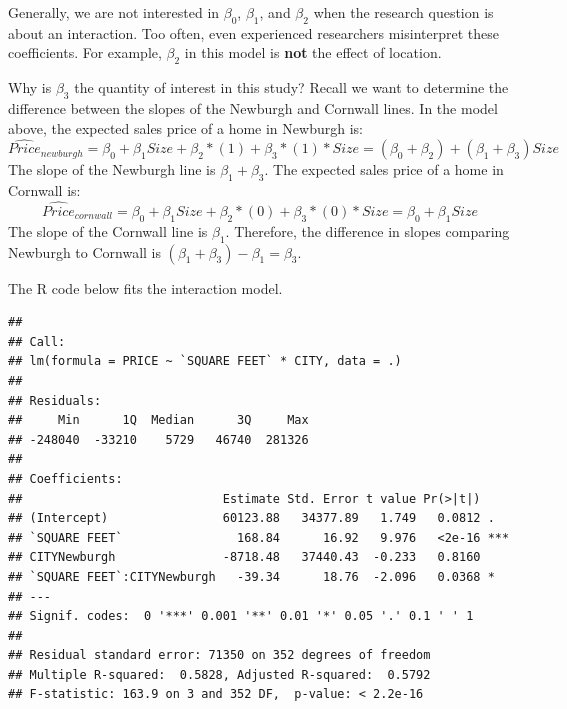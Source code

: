 \documentclass[]{book}
\newenvironment{Shaded}{\begin{snugshade}}{\end{snugshade}}
\newcommand{\DataTypeTok}[1]{\textcolor[rgb]{0.13,0.29,0.53}{#1}}
\newcommand{\KeywordTok}[1]{\textcolor[rgb]{0.13,0.29,0.53}{\textbf{#1}}}
\newcommand{\NormalTok}[1]{#1}
\newcommand{\OperatorTok}[1]{\textcolor[rgb]{0.81,0.36,0.00}{\textbf{#1}}}
\newcommand{\StringTok}[1]{\textcolor[rgb]{0.31,0.60,0.02}{#1}}
\begin{document}
Generally, we are not interested in \(\beta_0\), \(\beta_1\), and \(\beta_2\) when the research question is about an interaction. Too often, even experienced researchers misinterpret these coefficients. For example, \(\beta_2\) in this model is \textbf{not} the effect of location.

Why is \(\beta_3\) the quantity of interest in this study? Recall we want to determine the difference between the slopes of the Newburgh and Cornwall lines. In the model above, the expected sales price of a home in Newburgh is: \[\widehat{Price}_{newburgh} = \beta_0 + \beta_1 Size + \beta_2 * (1) + \beta_3 * (1) * Size = (\beta_0 + \beta_2) + (\beta_1 + \beta_3) Size\] The slope of the Newburgh line is \(\beta_1 + \beta_3\). The expected sales price of a home in Cornwall is: \[\widehat{Price}_{cornwall} = \beta_0 + \beta_1 Size + \beta_2 * (0) + \beta_3 * (0) * Size = \beta_0 + \beta_1 Size\] The slope of the Cornwall line is \(\beta_1\). Therefore, the difference in slopes comparing Newburgh to Cornwall is \((\beta_1 + \beta_3) - \beta_1 = \beta_3\).

The R code below fits the interaction model.

\begin{Shaded}
\end{Shaded}

\begin{verbatim}
## 
## Call:
## lm(formula = PRICE ~ `SQUARE FEET` * CITY, data = .)
## 
## Residuals:
##     Min      1Q  Median      3Q     Max 
## -248040  -33210    5729   46740  281326 
## 
## Coefficients:
##                            Estimate Std. Error t value Pr(>|t|)    
## (Intercept)                60123.88   34377.89   1.749   0.0812 .  
## `SQUARE FEET`                168.84      16.92   9.976   <2e-16 ***
## CITYNewburgh               -8718.48   37440.43  -0.233   0.8160    
## `SQUARE FEET`:CITYNewburgh   -39.34      18.76  -2.096   0.0368 *  
## ---
## Signif. codes:  0 '***' 0.001 '**' 0.01 '*' 0.05 '.' 0.1 ' ' 1
## 
## Residual standard error: 71350 on 352 degrees of freedom
## Multiple R-squared:  0.5828, Adjusted R-squared:  0.5792 
## F-statistic: 163.9 on 3 and 352 DF,  p-value: < 2.2e-16
\end{verbatim}
\end{document}
